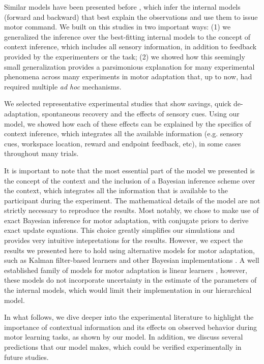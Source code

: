 \documentclass[a4paper,doc,floatsintext,natbib]{apa6}
\begin{document}
Similar models have been presented before \cite[e.g.][]{Wolpert_Multiple_1998,Baddeley_System_2003}, which infer the internal models (forward and backward) that best explain the observations and use them to issue motor command. We built on this studies in two important ways: (1) we generalized the inference over the best-fitting internal models to the concept of context inference, which includes all sensory information, in addition to feedback provided by the experimenters or the task; (2) we showed how this seemingly small generalization provides a parsimonious explanation for many experimental phenomena across many experiments in motor adaptation that, up to now, had required multiple \textit{ad hoc} mechanisms.

We selected representative experimental studies that show savings, quick de-adaptation, spontaneous recovery and the effects of sensory cues. Using our model, we showed how each of these effects can be explained by the specifics of context inference, which integrates all the available information (e.g. sensory cues, workspace location, reward and endpoint feedback, etc), in some cases throughout many trials.

It is important to note that the most essential part of the model we presented is the concept of the context and the inclusion of a Bayesian inference scheme over the context, which integrates all the information that is available to the participant during the experiment. The mathematical details of the model are not strictly necessary to reproduce the results. Most notably, we chose to make use of exact Bayesian inference for motor adaptation, with conjugate priors to derive exact update equations. This choice greatly simplifies our simulations and provides very intuitive intepretations for the results. However, we expect the results we presented here to hold using alternative models for motor adaptation, such as Kalman filter-based learners \cite[e.g.][]{Oh_Minimizing_2019,Baddeley_System_2003} and other Bayesian implementations \cite[e.g.][]{Wolpert_Multiple_1998,Kording_Bayesian_2004}. A well established family of models for motor adaptation is linear learners \cite[e.g.][]{Smith_Interacting_2006,Forano_Timescales_2020,Lee_Dual_2009}, however, these models do not incorporate uncertainty in the estimate of the parameters of the internal models, which would limit their implementation in our hierarchical model.

In what follows, we dive deeper into the experimental literature to highlight the importance of contextual information and its effects on observed behavior during motor learning tasks, as shown by our model. In addition, we discuss several predictions that our model makes, which could be verified experimentally in future studies.
\end{document}
